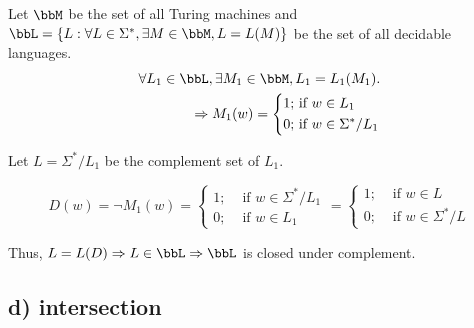 \documentclass[twoside,11pt]{homework}
\begin{document}
\begin{solution}
  Let $\bbM$ be the set of all Turing machines and\\ $\bbL = \{ L : \forall L \in \Sigma^*, \exists M
  \in \bbM, L = L(M) \}$ be the set of all decidable languages.
  \[
    \begin{aligned}
      \forall L_1 \in \bbL, \exists M_1 \in \bbM, L_1 = L_1(M_1).\\
      \Rightarrow M_1(w) =
      \left\{
      \begin{aligned}
        1 ;& \text{ if } w \in L_1\\
        0 ;& \text{ if } w \in \Sigma^* / L_1
      \end{aligned}
      \right. \\
    \end{aligned}
  \]

  Let $L = \Sigma^* / L_1$ be the complement set of $L_1$.

  \begin{construct}
    \[
      D(w) = \lnot M_1(w) =
      \left\{
      \begin{aligned}
        1 ;& \text{ if } w \in \Sigma^* / L_1\\
        0 ;& \text{ if } w \in L_1
      \end{aligned}
      \right.
      =
      \left\{
      \begin{aligned}
        1 ;& \text{ if } w \in L\\
        0 ;& \text{ if } w \in \Sigma^* / L
      \end{aligned}
      \right. 
    \]
  \end{construct}

  Thus, $L = L(D) \Rightarrow L \in \bbL \Rightarrow \bbL$ is closed under complement.

\end{solution}

\subsection*{d) intersection}
\end{document}
